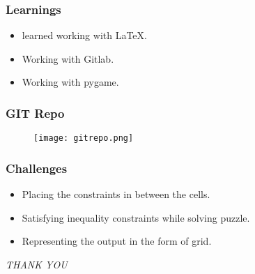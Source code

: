 \documentclass[14pt]{beamer}
\begin{document}
 \begin{frame}
  \frametitle{Learnings}
  \begin{itemize}
      \item learned working with LaTeX.
      \item Working with Gitlab.
      \item Working with pygame.
   \end{itemize}
\end{frame}
\begin{frame}
	\frametitle{GIT Repo}
	 \begin{figure}
       	\texttt{[image: gitrepo.png]}
   \end{figure}
    \end{frame}
\begin{frame}
  \frametitle{Challenges}
    \begin{itemize}
        \item Placing the constraints in between the cells.
        \item Satisfying inequality constraints while solving puzzle.
        \item Representing the output in the form of grid.
    \end{itemize}
\end{frame}
\begin{frame}
     \centering \Huge
     \emph{THANK YOU}
\end{frame}
 
\end{document}
